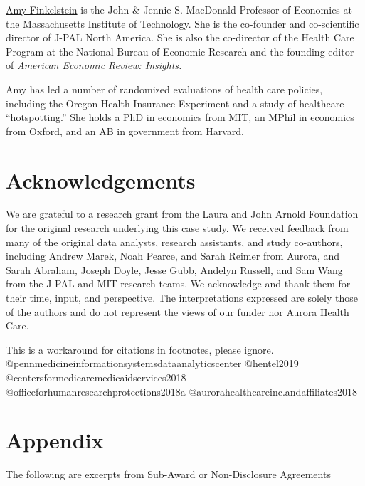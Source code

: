 \href{https://economics.mit.edu/faculty/afink}{Amy Finkelstein} is the John \& Jennie S. MacDonald Professor of Economics at the Massachusetts Institute of Technology. She is the co-founder and co-scientific director of J-PAL North America. She is also the co-director of the Health Care Program at the National Bureau of Economic Research and the founding editor of \emph{American Economic Review: Insights.}

Amy has led a number of randomized evaluations of health care policies, including the Oregon Health Insurance Experiment and a study of healthcare ``hotspotting.'' She holds a PhD in economics from MIT, an MPhil in economics from Oxford, and an AB in government from Harvard.

\hypertarget{acknowledgements-2}{%
\section*{Acknowledgements}\label{acknowledgements-2}}

We are grateful to a research grant from the Laura and John Arnold Foundation for the original research underlying this case study. We received feedback from many of the original data analysts, research assistants, and study co-authors, including Andrew Marek, Noah Pearce, and Sarah Reimer from Aurora, and Sarah Abraham, Joseph Doyle, Jesse Gubb, Andelyn Russell, and Sam Wang from the J-PAL and MIT research teams. We acknowledge and thank them for their time, input, and perspective. The interpretations expressed are solely those of the authors and do not represent the views of our funder nor Aurora Health Care.

\begin{invisible}
This is a workaround for citations in footnotes, please ignore.
@pennmedicineinformationsystemsdataanalyticscenter @hentel2019
@centersformedicaremedicaidservices2018
@officeforhumanresearchprotections2018a
@aurorahealthcareinc.andaffiliates2018
\end{invisible}

\putbib

\FloatBarrier\newpage

\hypertarget{appendix-4}{%
\section*{Appendix}\label{appendix-4}}

The following are excerpts from Sub-Award or Non-Disclosure Agreements


